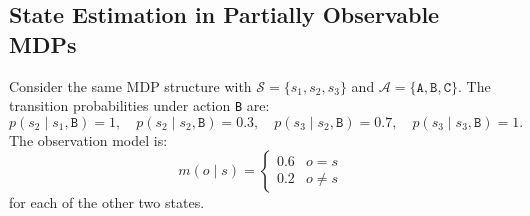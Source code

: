 \clearpage

\subsection{\points[6] State Estimation in Partially Observable MDPs}

Consider the same MDP structure with $\mathcal{S}=\{s_1,s_2,s_3\}$ and
$\mathcal{A}=\{\texttt{A},\texttt{B},\texttt{C}\}$.
The transition probabilities under action \texttt{B} are:
\[
p(s_2\mid s_1,\texttt{B})=1,\quad
p(s_2\mid s_2,\texttt{B})=0.3,\quad
p(s_3\mid s_2,\texttt{B})=0.7,\quad
p(s_3\mid s_3,\texttt{B})=1.
\]
The observation model is:
\[
m(o\mid s) = \begin{cases} 0.6 & o = s \\ 0.2 & o \neq s \end{cases}
\]
for each of the other two states.


